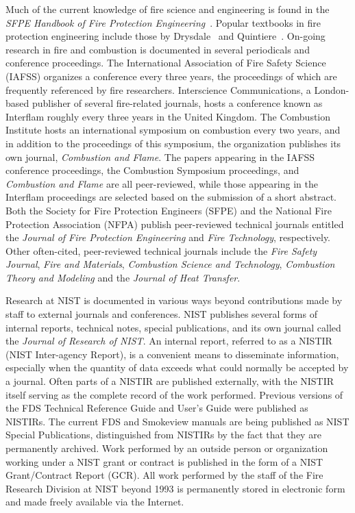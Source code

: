 \documentclass[11pt]{book}
\begin{document}
Much of the current knowledge of fire science and engineering is found in the {\em SFPE Handbook of Fire Protection Engineering}~\cite{SFPE}. Popular textbooks in fire protection engineering include those by Drysdale~\cite{Drysdale:1} and Quintiere~\cite{Quintiere:2}. On-going research in fire and combustion is documented in several periodicals and conference proceedings. The International Association of Fire Safety Science (IAFSS) organizes a conference every three years, the proceedings of which are frequently referenced by fire researchers. Interscience Communications, a London-based publisher of several fire-related journals, hosts a conference known as Interflam roughly every three years in the United Kingdom. The Combustion Institute hosts an international symposium on combustion every two years, and in addition to the proceedings of this symposium, the organization publishes its own journal, {\em Combustion and Flame}. The papers appearing in the IAFSS conference proceedings, the Combustion Symposium proceedings, and {\em Combustion and Flame} are all peer-reviewed, while those appearing in the Interflam proceedings are selected based on the submission of a short abstract. Both the Society for Fire Protection Engineers (SFPE) and the National Fire Protection Association (NFPA) publish peer-reviewed technical journals entitled the {\em Journal of Fire Protection Engineering} and {\em Fire Technology}, respectively. Other often-cited, peer-reviewed technical journals include the {\em Fire Safety Journal}, {\em Fire and Materials}, {\em Combustion Science and Technology}, {\em Combustion Theory and Modeling} and the {\em Journal of Heat Transfer}.

Research at NIST is documented in various ways beyond contributions made by staff to external journals and conferences. NIST publishes several forms of internal reports, technical notes, special publications, and its own journal called the {\em Journal of Research of NIST}. An internal report, referred to as a NISTIR (NIST Inter-agency Report), is a convenient means to disseminate information, especially when the quantity of data exceeds what could normally be accepted by a journal. Often parts of a NISTIR are published externally, with the NISTIR itself serving as the complete record of the work performed. Previous versions of the FDS Technical Reference Guide and User's Guide were published as NISTIRs. The current FDS and Smokeview manuals are being published as NIST Special Publications, distinguished from NISTIRs by the fact that they are permanently archived. Work performed by an outside person or organization working under a NIST grant or contract is published in the form of a NIST Grant/Contract Report (GCR). All work performed by the staff of the Fire Research Division at NIST beyond 1993 is permanently stored in electronic form and made freely available via the Internet.
\end{document}
